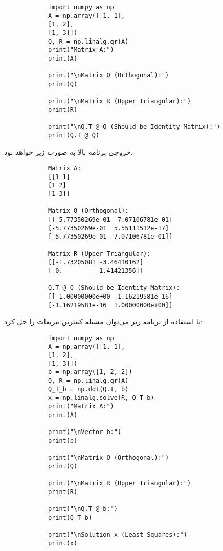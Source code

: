 \begin{code}
	\begin{latin}
		\begin{lstlisting}
			import numpy as np
			A = np.array([[1, 1], 
			[1, 2], 
			[1, 3]])
			Q, R = np.linalg.qr(A)
			print("Matrix A:")
			print(A)
			
			print("\nMatrix Q (Orthogonal):")
			print(Q)
			
			print("\nMatrix R (Upper Triangular):")
			print(R)
			
			print("\nQ.T @ Q (Should be Identity Matrix):")
			print(Q.T @ Q)
		\end{lstlisting}
	\end{latin}
\end{code}
خروجی برنامه بالا به صورت زیر خواهد بود.

\begin{code}
	\begin{latin}
		\begin{lstlisting}
			Matrix A:
			[[1 1]
			[1 2]
			[1 3]]
			
			Matrix Q (Orthogonal):
			[[-5.77350269e-01  7.07106781e-01]
			[-5.77350269e-01  5.55111512e-17]
			[-5.77350269e-01 -7.07106781e-01]]
			
			Matrix R (Upper Triangular):
			[[-1.73205081 -3.46410162]
			[ 0.         -1.41421356]]
			
			Q.T @ Q (Should be Identity Matrix):
			[[ 1.00000000e+00 -1.16219581e-16]
			[-1.16219581e-16  1.00000000e+00]]
		\end{lstlisting}
	\end{latin}
\end{code}
با استفاده از برنامه زیر می‌توان مسئله کمترین مربعات را حل کرد:
\begin{code}
	\begin{latin}
		\begin{lstlisting}
			import numpy as np
			A = np.array([[1, 1], 
			[1, 2], 
			[1, 3]])
			b = np.array([1, 2, 2])
			Q, R = np.linalg.qr(A)
			Q_T_b = np.dot(Q.T, b)
			x = np.linalg.solve(R, Q_T_b)
			print("Matrix A:")
			print(A)
			
			print("\nVector b:")
			print(b)
			
			print("\nMatrix Q (Orthogonal):")
			print(Q)
			
			print("\nMatrix R (Upper Triangular):")
			print(R)
			
			print("\nQ.T @ b:")
			print(Q_T_b)
			
			print("\nSolution x (Least Squares):")
			print(x)
		\end{lstlisting}
	\end{latin}
\end{code}
